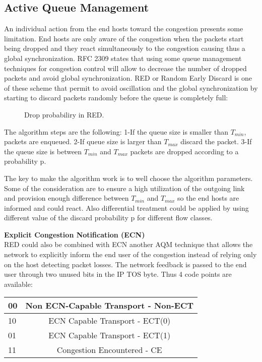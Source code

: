 \subsection{Active Queue Management}

An individual action from the end hosts toward the congestion presents some limitation. End hosts are only aware of the congestion when the packets start being dropped and they react simultaneously to the congestion causing thus a global synchronization. RFC 2309 states that using some queue management techniques for congestion control will allow to decrease the number of dropped packets and avoid global synchronization. 
RED or Random Early Discard is one of these scheme that permit to avoid oscillation and the global synchronization  by starting to discard packets randomly before the queue is completely full:

 \begin{figure}[h]
  \begin{center}
\caption{
  Drop probabiliry in RED.
    \label{fig:RED}
}
 \end{center}
\end{figure}

The algorithm steps are the following:
1-If the queue size is smaller than $T_{min}$, packets are enqueued.
2-If queue size is larger than $T_{max}$ discard the packet.
3-If the queue size is between $T_{min}$ and $T_{max}$ packets are dropped according to a probability p.

The key to make the algorithm work is to well choose the algorithm parameters. Some of the consideration are to ensure a high utilization of the outgoing link and provision enough difference between $T_{min}$ and $T_{max}$ so the end hosts are informed and could react. Also differential treatment could be applied by using different value of the discard probability p for different flow classes. 

{\bf Explicit Congestion Notification (ECN)}
\\RED could also be combined with ECN \cite {RFC 2481} another AQM technique that allows the network to explicitly inform the end user of the congestion instead of relying only on the host detecting packet losses. The network feedback is passed to the end user through two unused bits in the IP TOS byte.  Thus 4 code points are available:\\

\begin{center}
\begin{tabular}{| l | c| } \hline 
00 & Non ECN-Capable Transport - Non-ECT \\ \hline 
10 & ECN Capable Transport - ECT(0) \\ \hline 
01 & ECN Capable Transport - ECT(1) \\ \hline 
11 & Congestion Encountered - CE  \\ \hline 
\end{tabular}
\\
\caption{
  ECN codepoint.
    \label{fig:ECN}
}
\end{center}

